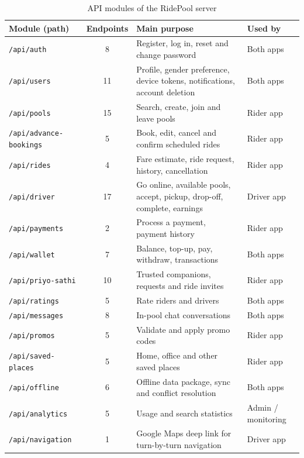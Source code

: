\begin{table}[H]
  \centering
  \small
  \caption{API modules of the RidePool server}
  \label{tab:api-modules}
  \begin{tabularx}{\textwidth}{@{}p{3.6cm}cLp{2.4cm}@{}}
    \toprule
    \textbf{Module (path)} & \textbf{Endpoints} & \textbf{Main purpose} & \textbf{Used by} \\
    \midrule
    \texttt{/api/auth}             & 8  & Register, log in, reset and change password & Both apps \\
    \texttt{/api/users}            & 11 & Profile, gender preference, device tokens, notifications, account deletion & Both apps \\
    \texttt{/api/pools}            & 15 & Search, create, join and leave pools & Rider app \\
    \texttt{/api/advance-bookings} & 5  & Book, edit, cancel and confirm scheduled rides & Rider app \\
    \texttt{/api/rides}            & 4  & Fare estimate, ride request, history, cancellation & Rider app \\
    \texttt{/api/driver}           & 17 & Go online, available pools, accept, pickup, drop-off, complete, earnings & Driver app \\
    \texttt{/api/payments}         & 2  & Process a payment, payment history & Rider app \\
    \texttt{/api/wallet}           & 7  & Balance, top-up, pay, withdraw, transactions & Both apps \\
    \texttt{/api/priyo-sathi}      & 10 & Trusted companions, requests and ride invites & Rider app \\
    \texttt{/api/ratings}          & 5  & Rate riders and drivers & Both apps \\
    \texttt{/api/messages}         & 8  & In-pool chat conversations & Both apps \\
    \texttt{/api/promos}           & 5  & Validate and apply promo codes & Rider app \\
    \texttt{/api/saved-places}     & 5  & Home, office and other saved places & Rider app \\
    \texttt{/api/offline}          & 6  & Offline data package, sync and conflict resolution & Both apps \\
    \texttt{/api/analytics}        & 5  & Usage and search statistics & Admin / monitoring \\
    \texttt{/api/navigation}       & 1  & Google Maps deep link for turn-by-turn navigation & Driver app \\
    \bottomrule
  \end{tabularx}
\end{table}

